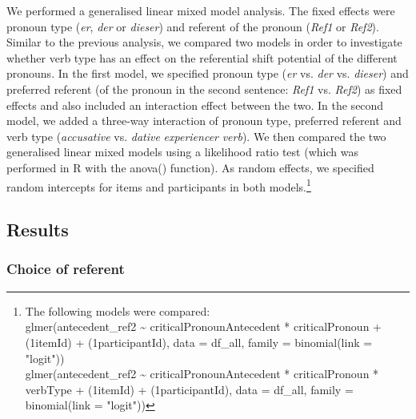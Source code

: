 \documentclass[output=paper,colorlinks,citecolor=brown]{langscibook}
\begin{document}
We performed a generalised linear mixed model analysis. The fixed effects were pronoun type (\textit{er}, \textit{der} or \textit{dieser}) and referent of the pronoun (\textit{Ref1} or \textit{Ref2}). Similar to the previous analysis, we compared two models in order to investigate whether verb type has an effect on the referential shift potential of the different pronouns. In the first model, we specified pronoun type (\textit{er} vs. \textit{der} vs. \textit{dieser}) and preferred referent (of the pronoun in the second sentence: \textit{Ref1} vs. \textit{Ref2}) as fixed effects and also included an interaction effect between the two. In the second model, we added a three-way interaction of pronoun type, preferred referent and verb type (\textit{accusative} vs. \textit{dative} \textit{experiencer} \textit{verb}). We then compared the two generalised linear mixed models using a likelihood ratio test (which was performed in R with the anova() function). As random effects, we specified random intercepts for items and participants in both models.\footnote{The following models were compared: \\ glmer(antecedent\_ref2 {\textasciitilde} criticalPronounAntecedent * criticalPronoun + (1{\textbar}itemId) + (1{\textbar}participantId), data = df\_all, family = binomial(link = "logit")) \\ glmer(antecedent\_ref2 {\textasciitilde} criticalPronounAntecedent * criticalPronoun * verbType + (1{\textbar}itemId) + (1{\textbar}participantId), data = df\_all, family = binomial(link = "logit"))}

\subsection{Results}\label{sec:fuchs:2.5}

\subsubsection{Choice of referent}\label{sec:fuchs:2.5.1}
\end{document}
